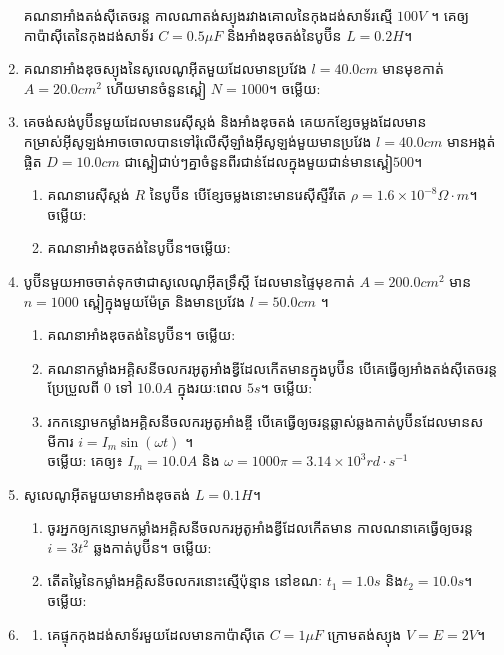 \documentclass{officialexam}
\begin{document}
\begin{enumerate}[m]
	គណនាអាំងតង់សុីតេចរន្ត កាលណាតង់ស្យុងរវាងគោលនៃកុងដង់សាទ័រស្មើ $100V$ ។ គេឲ្យកាប៉ាសុីតេនៃកុងដង់សាទ័រ $C=0.5\mu F$ និងអាំងឌុចតង់នៃបូប៊ីន $L=0.2H$។
	\item គណនាអាំងឌុចស្យុងនៃសូលេណូអុីតមួយដែលមានប្រវែង $l=40.0cm$ មានមុខកាត់ $A=20.0cm^2$ ហើយមានចំនួនស្ពៀ $N=1000$។ ចម្លើយ​: 
	\item គេចង់សង់បូប៊ីនមួយដែលមានរេសុីស្តង់ និងអាំងឌុចតង់ គេយកខ្សែចម្លងដែលមានកម្រាស់អុីសូឡង់អាចចោលបានទៅរុំលើសុីឡាំងអុីសូឡង់មួយមានប្រវែង $l=40.0cm$ មានអង្កត់ផ្ចិត $D=10.0cm$ ជា​​ស្ពៀ​​ជាប់ៗគ្នាចំនួនពីរជាន់ដែលក្នុងមួយជាន់មានស្ពៀ$500$។
	\begin{enumerate}[k]
		\item គណនារេសុីស្តង់ $R$ នៃបូប៊ីន បើខ្សែចម្លងនោះមានរេសុីស្ទីវីតេ $\rho=1.6\times10^{-8}\Omega\cdot m$។ ចម្លើយ​: 
		\item គណនាអាំងឌុចតង់នៃបូប៊ីន។ចម្លើយ​: 
	\end{enumerate}
	\item បូប៊ីនមួយអាចចាត់ទុកថាជាសូលេណូអុីតទ្រឹស្តី ដែលមានផ្ទៃមុខកាត់ $A=200.0cm^2$ មាន $n=1000$ ស្ពៀក្នុងមួយម៉ែត្រ និងមានប្រវែង $l=50.0cm$ ។
	\begin{enumerate}[k]
		\item គណនាអាំងឌុចតង់នៃបូប៊ីន។ ចម្លើយ​: 
		\item គណនាកម្លាំងអគ្គិសនីចលករអូតូអាំងឌ្វីដែលកើតមានក្នុងបូប៊ីន បើគេធ្វើឲ្យអាំងតង់សុីតេចរន្តប្រែប្រួលពី $0$ ទៅ $10.0A$ ក្នុងរយៈពេល $5s$។ ចម្លើយ​: 
		\item រកកន្សោមកម្លាំងអគ្គិសនីចលករអូតូអាំងឌ្ចី បើគេធ្វើឲ្យចរន្តឆ្លាស់ឆ្លងកាត់បូប៊ីនដែលមានសមីការ $i=I_m\sin\left(\omega t\right)$ ។\\
		ចម្លើយ​: 
		គេឲ្យ៖ $I_m=10.0A$ និង $\omega=1000\pi=3.14\times10^{3}rd\cdot s^{-1}$
	\end{enumerate}
	\item សូលេណូអុីតមួយមានអាំងឌុចតង់ $L=0.1H$។
	\begin{enumerate}[k]
		\item ចូរអ្នកឲ្យកន្សោមកម្លាំងអគ្គិសនីចលករអូតូអាំងឌ្វីដែលកើតមាន កាលណនាគេធ្វើឲ្យចរន្ត $i=3t^2$ ឆ្លងកាត់បូប៊ីន។ ចម្លើយ​: 
		\item តើតម្លៃនៃកម្លាំងអគ្គិសនីចលករនោះស្មើប៉ុន្មាន នៅខណៈ $t_1=1.0s$ និង​ $t_2=10.0s$។ ចម្លើយ​: 
	\end{enumerate}
	\item \begin{enumerate}[k]
		\item គេផ្ទុកកុងដង់សាទ័រមួយដែលមានកាប៉ាសុីតេ $C=1\mu F$ ក្រោមតង់ស្យុង $V=E=2V$។\\

\end{enumerate}
\end{enumerate}
\end{document}
